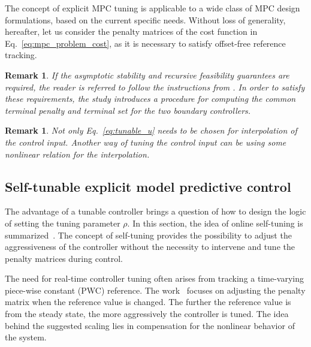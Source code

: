 \documentclass[preprint,12pt]{elsarticle}
\newtheorem{remark}[theorem]{Remark}
\begin{document}
	The concept of explicit MPC tuning is applicable to a wide class of MPC design formulations, based on the current specific needs. Without loss of generality, hereafter, let us consider the penalty matrices of the cost function in Eq.~\eqref{eq:mpc_problem_cost}, as it is necessary to satisfy offset-free reference tracking.
	
	\begin{remark}
		If the asymptotic stability and recursive feasibility guarantees are required, the reader is referred to follow the instructions from \cite{Oravec_tunable}. In order to satisfy these requirements, the study introduces a procedure for computing the common terminal penalty and terminal set for the two boundary controllers. 
	\end{remark}

	\begin{remark}
		Not only Eq.~\eqref{eq:tunable_u} needs to be chosen for interpolation of the control input. Another way of tuning the control input can be using some nonlinear relation for the interpolation. 
	\end{remark}


	
	\subsection{Self-tunable explicit model predictive control}
	\label{sec:self_tunable}	
	The advantage of a tunable controller brings a question of how to design the logic of setting the tuning parameter $\rho$. In this section, the idea of online self-tuning is summarized~\cite{self_tunable}. The concept of self-tuning provides the possibility to adjust the aggressiveness of the controller without the necessity to intervene and tune the penalty matrices during control. 
	
	The need for real-time controller tuning often arises from tracking a time-varying piece-wise constant (PWC) reference. The work~\cite{self_tunable} focuses on adjusting the penalty matrix when the reference value is changed. The further the reference value is from the steady state, the more aggressively the controller is tuned. The idea behind the suggested scaling lies in compensation for the nonlinear behavior of the system.  
	
\end{document}
